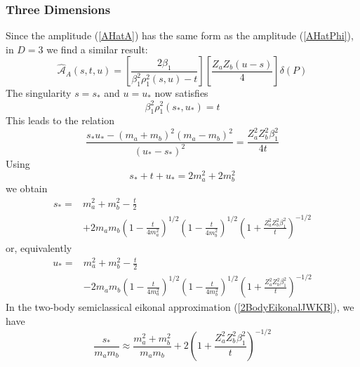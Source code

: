 \subsubsection{Three Dimensions}
Since the amplitude (\ref{AHatA}) has the same form as the amplitude (\ref{AHatPhi}), in $D = 3$ we find a similar result:
\begin{equation}
	\widehat{\mathcal{A}}_{A}(s, t, u) = \left[ \frac{2 \beta_{1}}{\beta_{1}^{2} \rho_{1}^{2}(s, u) - t} \right] \left[ \frac{Z_{a} Z_{b} (u - s)}{4} \right] \delta(P)
\end{equation}
The singularity $s = s_{*}$ and $u = u_{*}$ now satisfies
\begin{equation}
	\beta_{1}^{2} \rho_{1}^{2}(s_{*}, u_{*}) = t \label{b1rho1t}
\end{equation}
This leads to the relation
\begin{equation}
	\frac{s_{*} u_{*} - (m_{a} + m_{b})^{2} (m_{a} - m_{b})^{2} }{(u_{*} - s_{*})^{2}} = \frac{Z_{a}^{2} Z_{b}^{2} \beta_{1}^{2}}{4 t}
\end{equation}
Using
\begin{equation}
	s_{*} + t + u_{*} = 2m_{a}^{2} + 2m_{b}^{2}
\end{equation}
we obtain
\begin{equation}
\begin{split}
	s_{*} = {}& m_{a}^{2} + m_{b}^{2} - \frac{t}{2} \\
	&+ 2 m_{a} m_{b} \left(1 - \frac{t}{4m_{a}^{2}} \right)^{1/2} \left(1 - \frac{t}{4m_{b}^{2}} \right)^{1/2} \left(1 + \frac{Z_{a}^{2} Z_{b}^{2} \beta_{1}^{2}}{t} \right)^{-1/2}
\end{split} \label{sJtVec3}
\end{equation}
or, equivalently
\begin{equation}
\begin{split}
	u_{*} = {}& m_{a}^{2} + m_{b}^{2} - \frac{t}{2} \\
	&- 2 m_{a} m_{b} \left(1 - \frac{t}{4m_{a}^{2}} \right)^{1/2} \left(1 - \frac{t}{4m_{b}^{2}} \right)^{1/2} \left(1 + \frac{Z_{a}^{2} Z_{b}^{2} \beta_{1}^{2}}{t} \right)^{-1/2}
\end{split} \label{uJtVec3}
\end{equation}
In the two-body semiclassical eikonal approximation (\ref{2BodyEikonalJWKB}), we have
\begin{equation}
	\frac{s_{*}}{m_{a} m_{b}} \approx \frac{m_{a}^{2} + m_{b}^{2}}{m_{a} m_{b}} + 2 \left(1 + \frac{Z_{a}^{2} Z_{b}^{2} \beta_{1}^{2}}{t} \right)^{-1/2} \label{sJVec3}
\end{equation}
